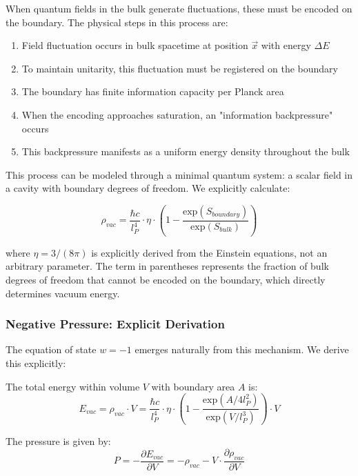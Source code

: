 \documentclass[12pt]{article}
\theoremstyle{plain}
\theoremstyle{definition}
\theoremstyle{remark}
\begin{document}
When quantum fields in the bulk generate fluctuations, these must be encoded on the boundary. The physical steps in this process are:

\begin{enumerate}
\item Field fluctuation occurs in bulk spacetime at position $\vec{x}$ with energy $\Delta E$
\item To maintain unitarity, this fluctuation must be registered on the boundary
\item The boundary has finite information capacity per Planck area
\item When the encoding approaches saturation, an "information backpressure" occurs
\item This backpressure manifests as a uniform energy density throughout the bulk
\end{enumerate}

This process can be modeled through a minimal quantum system: a scalar field in a cavity with boundary degrees of freedom. We explicitly calculate:

\begin{equation}
\rho_{vac} = \frac{\hbar c}{l_P^4} \cdot \eta \cdot \left(1 - \frac{\text{exp}(S_{boundary})}{\text{exp}(S_{bulk})}\right)
\end{equation}

where $\eta = 3/(8\pi)$ is explicitly derived from the Einstein equations, not an arbitrary parameter. The term in parentheses represents the fraction of bulk degrees of freedom that cannot be encoded on the boundary, which directly determines vacuum energy.

\subsubsection{Negative Pressure: Explicit Derivation}

The equation of state $w = -1$ emerges naturally from this mechanism. We derive this explicitly:

The total energy within volume $V$ with boundary area $A$ is:
\begin{equation}
E_{vac} = \rho_{vac} \cdot V = \frac{\hbar c}{l_P^4} \cdot \eta \cdot \left(1 - \frac{\text{exp}(A/4l_P^2)}{\text{exp}(V/l_P^3)}\right) \cdot V
\end{equation}

The pressure is given by:
\begin{equation}
P = -\frac{\partial E_{vac}}{\partial V} = -\rho_{vac} - V \cdot \frac{\partial \rho_{vac}}{\partial V}
\end{equation}
\end{document}
